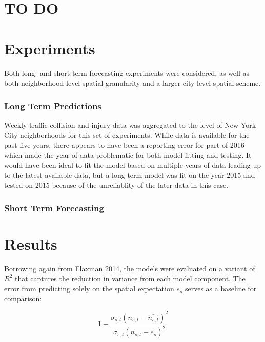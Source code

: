 \documentclass{article}
\begin{document}
\section{TO DO}

\listoftodos

\section{Experiments}

Both long- and short-term forecasting experiments were considered, as well as both neighborhood level spatial granularity and a larger city level spatial scheme.

\subsubsection{Long Term Predictions}

 Weekly traffic collision and injury data was aggregated to the level of New York City neighborhoods for this set of experiments. While data is available for the past five years, there appears to have been a reporting error for part of 2016 which made the year of data problematic for both model fitting and testing. It would have been ideal to fit the model based on multiple years of data leading up to the latest available data, but a long-term model was fit on the year 2015 and tested on 2015 because of the unreliablity of the later data in this case. \par




\subsubsection{Short Term Forecasting}

\section{Results}

Borrowing again from Flaxman 2014, the models were evaluated on a variant of $R^2$ that captures the reduction in variance from each model component. The error from predicting solely on the spatial expectation $e_s$ serves as a baseline for comparison:

$$ 1 - \frac{\sigma_{s,t}(n_{s,t}- \hat{n_{s,t}})^2}{\sigma_{s,t}(n_{s,t} - e_{s})^2}$$









\end{document}
